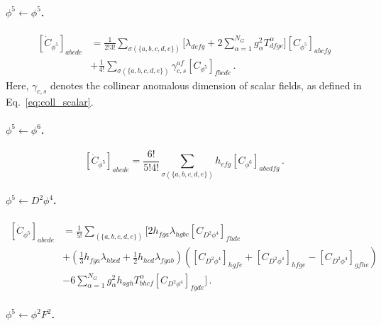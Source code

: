 \paragraph{\texorpdfstring{$\phi^5 \leftarrow \phi^5$}{phi5fromphi5}.}
\label{par:phi5<-phi5}

\begin{align}
    \left[\dot C_{\phi^5}\right]_{abcde} &= \frac{1}{2!3!}\sum_{\sigma(\{a,b,c,d,e\})}\bigg[\lambda_{defg}+2\sum_{\alpha=1}^{N_G} g_\alpha^2 T^\alpha_{dfge}\bigg]\left[ C_{\phi^5}\right]_{abcfg} \nonumber \\
    & + \frac{1}{4!}\sum_{\sigma(\{a,b,c,d,e\})}\gamma_{c,s}^{af}\left[C_{\phi^5}\right]_{fbcde}\,.
\end{align}
Here, $\gamma_{c,s}$ denotes the collinear anomalous dimension of scalar fields, as defined in Eq.~\eqref{eq:coll_scalar}.

\paragraph{\texorpdfstring{$\phi^5 \leftarrow \phi^6$}{phi5fromphi6}.}
\label{par:phi5<-phi6}

\begin{equation}
    \left[\dot C_{\phi^5}\right]_{abcde} = \frac{6!}{5!4!}\sum_{\sigma(\{a,b,c,d,e\})}h_{efg}\left[ C_{\phi^6}\right]_{abcdfg}\,.
\end{equation}

\paragraph{\texorpdfstring{$\phi^5 \leftarrow D^2\phi^4$}{phi5fromD2phi4}.}
\label{par:phi5<-D2phi4}

\begin{align}
    \left[\dot C_{\phi^5}\right]_{abcde} &=  \frac{1}{5!}\sum_{(\{a,b,c,d,e\})}\Bigg[2h_{fga}\lambda_{hgbc}\left[C_{D^2\phi^4}\right]_{fhde}\nonumber\\ \nonumber
    &+\left(\frac{1}{3}h_{fga}\lambda_{hbcd}+\frac{1}{2}h_{hcd}\lambda_{fgab}\right)\left(\left[C_{D^2\phi^4}\right]_{hgfe}+\left[C_{D^2\phi^4}\right]_{hfge}-\left[C_{D^2\phi^4}\right]_{gfhe}\right)\\
    &-6\sum_{\alpha=1}^{N_G} g_\alpha^2 h_{agh} T^\alpha_{bhcf} \left[C_{D^2\phi^4}\right]_{fgde}\Bigg]\,.
\end{align}

\paragraph{\texorpdfstring{$\phi^5 \leftarrow \phi^2 F^2$}{phi5fromphi2F2}.}
\label{par:phi5<-phi2F2}

